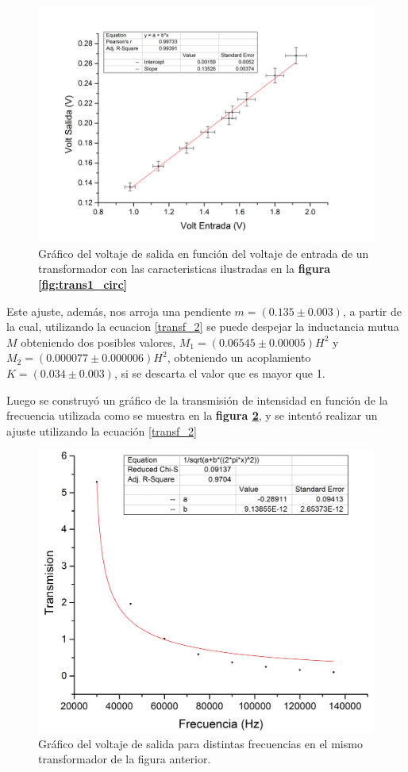 \documentclass[11pt,a4paper]{article}
\begin{document}
\begin{figure}[H]
	\centering
	\includegraphics[scale=0.35]{Transformador1_Vent_vs_Vsal}
	\caption{Gráfico del voltaje de salida en función del voltaje de entrada de un transformador con las caracteristicas ilustradas en la \textbf{figura \ref{fig:trans1_circ}} }
	\label{fig:Tr1-Recta}
\end{figure}

Este ajuste, además, nos arroja una pendiente $m= (0.135 \pm 0.003)$, a partir de la cual, utilizando la ecuacion \eqref{transf_2} se puede despejar la inductancia mutua $M$ obteniendo dos posibles valores, $M_{1} = (0.06545\pm 0.00005)H^2 $ y $M_{2} = (0.000077\pm 0.000006)H^2$, obteniendo un acoplamiento $K = (0.034\pm 0.003)$, si se descarta el valor que es mayor que 1.

Luego se construyó un gráfico de la transmisión de intensidad en función de la frecuencia utilizada como se muestra en la \textbf{figura \ref{fig:Tr1-Hip}}, y se intentó realizar un ajuste utilizando la ecuación \eqref{transf_2}

\begin{figure}[H]
	\centering
	\includegraphics[scale=0.35]{Transmision_vs_Frecuencia_choto}
	\caption{Gráfico del voltaje de salida  para distintas frecuencias en el mismo transformador de la figura anterior.}
	\label{fig:Tr1-Hip}
\end{figure}
\end{document}
